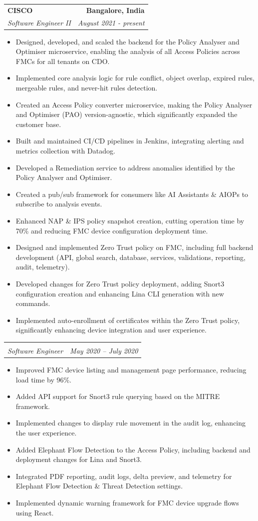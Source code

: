 \documentclass[letterpaper,11pt]{article}
\makeatletter
\newcommand{\resumeItem}[1]{
  \item\small{
    {#1 \vspace{-2pt}}
  }
}
\newcommand{\resumeSubheading}[4]{
  \vspace{-2pt}\item
    \begin{tabular*}{1.0\textwidth}[t]{l@{\extracolsep{\fill}}r}
      \textbf{#1} & \textbf{\small #2} \\
      \textit{\small#3} & \textit{\small #4} \\
    \end{tabular*}\vspace{-7pt}
}
\newcommand{\resumeItemListStart}{\begin{itemize}}
\newcommand{\resumeItemListEnd}{\end{itemize}\vspace{-5pt}}
\makeatother
\begin{document}
\resumeSubheading
{CISCO}{Bangalore, India}
{Software Engineer II}{August 2021 - present}
\resumeItemListStart
\resumeItem{Designed, developed, and scaled the backend for the Policy Analyser and Optimiser microservice, enabling the analysis of all Access Policies across FMCs for all tenants on CDO.}
\resumeItem{Implemented core analysis logic for rule conflict, object overlap, expired rules, mergeable rules, and never-hit rules detection.}
\resumeItem{Created an Access Policy converter microservice, making the Policy Analyser and Optimiser (PAO) version-agnostic, which significantly expanded the customer base.
}
\resumeItem{Built and maintained CI/CD pipelines in Jenkins, integrating alerting and metrics collection with Datadog.}
\resumeItem{Developed a Remediation service to address anomalies identified by the Policy Analyser and Optimiser.}
\resumeItem{Created a pub/sub framework for consumers like AI Assistants \& AIOPs to subscribe to analysis events.}
\resumeItem{Enhanced NAP \& IPS policy snapshot creation, cutting operation time by 70\% and reducing FMC device configuration deployment time.}
\resumeItem{Designed and implemented Zero Trust policy on FMC, including full backend development (API, global search, database, services, validations, reporting, audit, telemetry).}
\resumeItem{Developed changes for Zero Trust policy deployment, adding Snort3 configuration creation and enhancing Lina CLI generation with new commands.}
\resumeItem{Implemented auto-enrollment of certificates within the Zero Trust policy, significantly enhancing device integration and user experience.}
\resumeItemListEnd
\vspace{-7pt}

\resumeSubheading
{}{}
{Software Engineer}{May 2020 – July 2020}
\resumeItemListStart
\resumeItem{Improved FMC device listing and management page performance, reducing load time by 96\%.}
\resumeItem{Added API support for Snort3 rule querying based on the MITRE framework.}
\resumeItem{Implemented changes to display rule movement in the audit log, enhancing the user experience.}
\resumeItem{Added Elephant Flow Detection to the Access Policy, including backend and deployment changes for Lina and Snort3.}
\resumeItem{Integrated PDF reporting, audit logs, delta preview, and telemetry for Elephant Flow Detection \& Threat Detection settings.}
\resumeItem{Implemented dynamic warning framework for FMC device upgrade flows using React.}
\resumeItemListEnd

\vspace{7pt}
\end{document}
